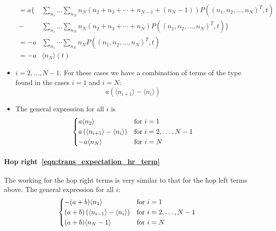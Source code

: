 \documentclass[a4paper,11pt]{article}
\numberwithin{equation}{section}
\newcommand{\E}[1]{\langle #1 \rangle}
\begin{document}
\begin{itemize}
\begin{align*}
            = a\biggl\{
                & \sum_{n_1} \dotso \sum_{n_N} n_N \left(n_2 + n_3 +
                \dotsb + n_{N-1} + (n_N - 1)\right)
                P\left(\left(n_1,n_2,\dotsc,n_N\right)^T,t\right) \\
                - & \sum_{n_1} \dotso \sum_{n_N} n_N\left(n_2 + n_3 + \dotsb +
                n_N\right) P\left(\left(n_1,n_2,\dotsc,n_N\right)^T,t\right)
            \biggr\} \\
            = - a & \sum_{n_1} \dotsb \sum_{n_N} n_N
                P\left(\left(n_1,n_2,\dotsc,n_N\right)^T,t\right) \\
            = - a & \E{n_N}(t)
        \end{align*}
    \item \(i=2,\dotsc,N-1\). For these cases we have a combination of terms of
        the type found in the cases \(i=1\) and \(i=N\):
        \begin{equation*}
            a\left(\E{n_{i+1}}-\E{n_i}\right)
        \end{equation*}
    \item The general expression for all \(i\) is
        \begin{equation*}
            \begin{dcases*}
                a\E{n_2} & for \(i=1\)\\
                a\left(\E{n_{i+1}} - \E{n_i}\right) & for \(i=2,\dotsc,N-1\)\\
                -a\E{n_N} & for \(i=N\)
            \end{dcases*}
        \end{equation*}
\end{itemize}

\paragraph{Hop right~\eqref{eqn:trans_expectation_hr_term}}
The working for the hop right terms is very similar to that for the hop left
terms above. The general expression for all \(i\):
\begin{equation*}
    \begin{dcases*}
        -(a+b)\E{n_1} & for \(i=1\)\\
        (a+b)\left(\E{n_{i-1}} - \E{n_i}\right) & for \(i=2,\dotsc,N-1\)\\
        (a+b)\E{n_N-1} & for \(i=N\)
    \end{dcases*}
\end{equation*}
\end{document}
